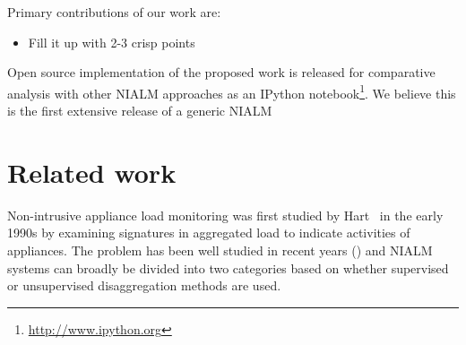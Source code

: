 \documentclass[conference]{IEEEtran}
\begin{document}
Primary contributions of our work are:
\begin{itemize}
\item Fill it up with 2-3 crisp points
\end{itemize}
Open source implementation of the proposed work is released for comparative analysis with other NIALM approaches as an IPython notebook\footnote{\url{http://www.ipython.org}}. We believe this is the first extensive release of a generic NIALM

\section{Related work}
\noindent Non-intrusive appliance load monitoring was first studied by Hart~\cite{hart} in the early 1990s by examining signatures in aggregated load to indicate activities of appliances. The problem has been well studied in recent years (\cite{survey1,survey2,survey3}) and NIALM systems can broadly be divided into two categories based on whether supervised or unsupervised disaggregation methods are used.
\end{document}
